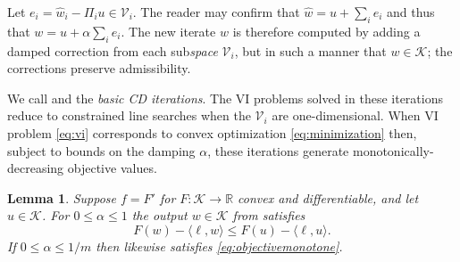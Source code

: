 \documentclass[letterpaper,final,12pt,reqno]{amsart}
\theoremstyle{cstyle}
\newtheorem{lemma}[theorem]{Lemma}
\theoremstyle{cstyle*}
\theoremstyle{dstyle}
\numberwithin{equation}{section}
\numberwithin{figure}{section}
\numberwithin{table}{section}
\numberwithin{theorem}{section}
\newcommand{\RR}{\mathbb{R}}
\newcommand{\cK}{\mathcal{K}}
\newcommand{\cV}{\mathcal{V}}
\newcommand{\ip}[2]{\langle#1,#2\rangle}
\begin{document}
Let $e_i = \hat w_i - \Pi_i u \in \cV_i$.  The reader may confirm that $\hat w = u + \sum_{i} e_i$ and thus that $w = u + \alpha \sum_i e_i$.  The new iterate $w$ is therefore computed by adding a damped correction from each sub\emph{space} $\mathcal{V}_i$, but in such a manner that $w \in \mathcal{K}$; the corrections preserve admissibility.

We call  and  the \emph{basic CD iterations}.  The VI problems solved in these iterations reduce to constrained line searches when the $\cV_i$ are one-dimensional.  When VI problem \eqref{eq:vi} corresponds to convex optimization \eqref{eq:minimization} then, subject to bounds on the damping $\alpha$, these iterations generate monotonically-decreasing objective values.
\begin{lemma} \cite{Tai2003}  Suppose $f=F'$ for $F:\cK\to\RR$ convex and differentiable, and let $u\in\cK$.  For $0 \le \alpha \le 1$ the output $w \in \cK$ from  satisfies
\begin{equation}
F(w) - \ip{\ell}{w} \le F(u) - \ip{\ell}{u}.  \label{eq:objectivemonotone}
\end{equation}
If $0 \le \alpha \le 1/m$ then  likewise satisfies \eqref{eq:objectivemonotone}.
\end{lemma}
\end{document}
